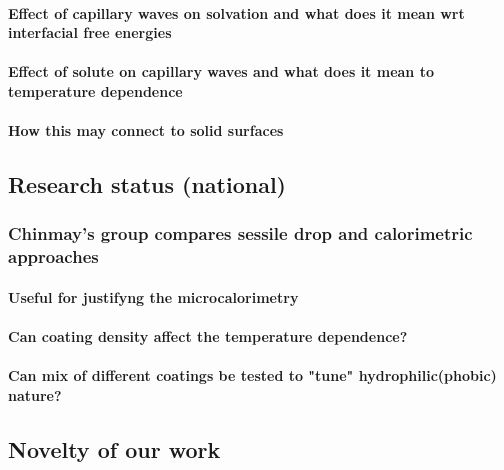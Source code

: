 \documentclass[a4paper,12pt,single,pdftex]{article}
\begin{document}
\label{ID_106467715}\paragraph{Effect of capillary waves on solvation and what does it mean wrt interfacial free energies}

\label{ID_1103070320}\paragraph{Effect of solute on capillary waves and what does it mean to temperature dependence}

\label{ID_276381896}\paragraph{How this may connect to solid surfaces}

\label{ID_374576713}\subsection{Research status (national)}

\label{ID_135785427}\subsubsection{Chinmay's group compares sessile drop and calorimetric approaches}

\label{ID_1532965186}\paragraph{Useful for justifyng the microcalorimetry}

\label{ID_838488932}\paragraph{Can coating density affect the temperature dependence?}

\label{ID_1401479645}\paragraph{Can mix of different coatings be tested to "tune" hydrophilic(phobic) nature?}

\label{ID_1979164963}\subsection{Novelty of our work}
\end{document}
